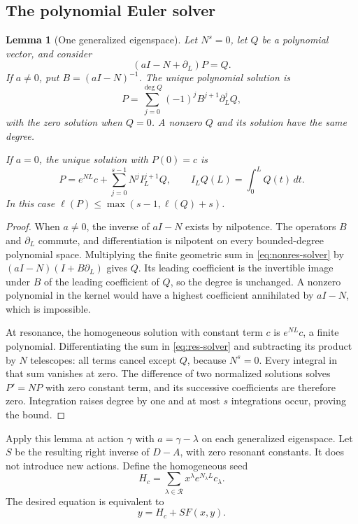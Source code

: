 \documentclass[11pt,a4paper]{article}
\numberwithin{equation}{section}
\newtheorem{lemma}[theorem]{Lemma}
\theoremstyle{definition}
\theoremstyle{remark}
\newcommand{\Reson}{\mathcal R}
\newcommand{\dd}{\partial_L}
\begin{document}
\subsection{The polynomial Euler solver}
\begin{lemma}[One generalized eigenspace]\label{lem:solver}
Let \(N^s=0\), let \(Q\) be a polynomial vector, and consider
\begin{equation}\label{eq:block}
 (aI-N+\dd)P=Q.
\end{equation}
If \(a\ne0\), put \(B=(aI-N)^{-1}\). The unique polynomial solution is
\begin{equation}\label{eq:nonres-solver}
 P=\sum_{j=0}^{\deg Q}(-1)^j B^{j+1}\dd^jQ,
\end{equation}
with the zero solution when \(Q=0\). A nonzero \(Q\) and its solution
have the same degree.

If \(a=0\), the unique solution with \(P(0)=c\) is
\begin{equation}\label{eq:res-solver}
 P=e^{NL}c+\sum_{j=0}^{s-1}N^j I_L^{j+1}Q,
 \qquad I_LQ(L)=\int_0^LQ(t)\,dt.
\end{equation}
In this case
\(\ell(P)\le\max(s-1,\ell(Q)+s)\).
\end{lemma}
\begin{proof}
When \(a\ne0\), the inverse of \(aI-N\) exists by nilpotence.
The operators \(B\) and \(\dd\) commute, and differentiation is
nilpotent on every bounded-degree polynomial space. Multiplying the
finite geometric sum in \eqref{eq:nonres-solver} by
\((aI-N)(I+B\dd)\) gives \(Q\). Its leading coefficient is the
invertible image under \(B\) of the leading coefficient of \(Q\), so
the degree is unchanged. A nonzero polynomial in the kernel would have
a highest coefficient annihilated by \(aI-N\), which is impossible.

At resonance, the homogeneous solution with constant term \(c\) is
\(e^{NL}c\), a finite polynomial. Differentiating the sum in
\eqref{eq:res-solver} and subtracting its product by \(N\) telescopes:
all terms cancel except \(Q\), because \(N^s=0\). Every integral in
that sum vanishes at zero. The difference of two normalized solutions
solves \(P'=NP\) with zero constant term, and its successive
coefficients are therefore zero. Integration raises degree by one and
at most \(s\) integrations occur, proving the bound.
\end{proof}

Apply this lemma at action \(\gamma\) with \(a=\gamma-\lambda\) on
each generalized eigenspace. Let \(S\) be the resulting right inverse
of \(D-A\), with zero resonant constants. It does not introduce new
actions. Define the homogeneous seed
\begin{equation}\label{eq:seed}
 H_c=\sum_{\lambda\in\Reson}x^\lambda e^{N_\lambda L}c_\lambda.
\end{equation}
The desired equation is equivalent to
\begin{equation}\label{eq:fixedpoint}
 y=H_c+S F(x,y).
\end{equation}
\end{document}
